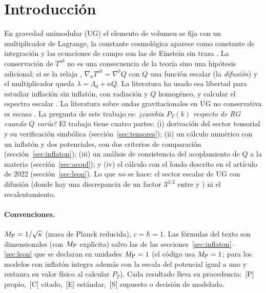 \documentclass[11pt,a4paper]{article}
\numberwithin{equation}{section}
\newcommand{\MP}{M_{\rm P}}\newcommand{\kap}{\kappa}\newcommand{\Lb}{\bar\lambda}\newcommand{\dd}{\mathrm d}\newcommand{\ee}{\mathrm e}
\newcommand{\etq}[1]{\,{\footnotesize\color{gray}[#1]}}
\begin{document}
\section{Introducci\'on}
En gravedad unimodular (UG) el elemento de volumen se fija con un multiplicador de Lagrange, la constante cosmol\'ogica aparece como constante de integraci\'on y las ecuaciones de campo son las de Einstein sin traza \cite{bengochea23}. La conservaci\'on de $T^{ab}$ no es una consecuencia de la teor\'ia sino una hip\'otesis adicional; si se la relaja \cite{josset17}, $\nabla_aT^{ab}=\nabla^bQ$ con $Q$ una funci\'on escalar (la \emph{difusi\'on}) y el multiplicador queda $\lambda=\Lambda_0+\kap Q$. La literatura ha usado esa libertad para estudiar inflaci\'on sin inflat\'on, con radiaci\'on y $Q$ homog\'eneo, y calcular el espectro escalar \cite{leon22,piccirilli23}. La literatura sobre ondas gravitacionales en UG no conservativa es escasa \cite{fabris22}. La pregunta de este trabajo es: \emph{¿cambia $P_T(k)$ respecto de RG cuando $Q$ var\'ia?} El trabajo tiene cuatro partes: (i) derivaci\'on del sector tensorial y su verificaci\'on simb\'olica (secci\'on~\ref{sec:tensores}); (ii) un c\'alculo num\'erico con un inflat\'on y dos potenciales, con dos criterios de comparaci\'on (secci\'on~\ref{sec:inflaton}); (iii) un an\'alisis de consistencia del acoplamiento de $Q$ a la materia (secci\'on~\ref{sec:acopl}); y (iv) el c\'alculo con el fondo descrito en el art\'iculo de 2022 \cite{leon22} (secci\'on~\ref{sec:leon}). Lo que \emph{no} se hace: el sector escalar de UG con difusi\'on (donde hay una discrepancia de un factor $3^{3/2}$ entre \cite{leon22} y \cite{piccirilli23}) ni el recalentamiento.

\paragraph{Convenciones.} $\MP=1/\sqrt{\kap}$ (masa de Planck reducida), $c=\hbar=1$. Las f\'ormulas del texto son dimensionales (con $\MP$ expl\'icita) salvo las de las secciones~\ref{sec:inflaton}--\ref{sec:leon} que se declaran en unidades $\MP=1$ (el código usa $\MP=1$; para los modelos con inflatón integra además con la escala del potencial igual a uno y restaura su valor físico al calcular $P_T$). Cada resultado lleva su procedencia: \etq{P} propio, \etq{C} citado, \etq{E} est\'andar, \etq{S} supuesto o decisi\'on de modelado.
\end{document}
